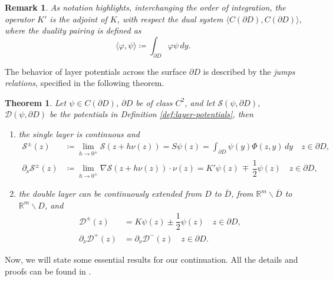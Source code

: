 \documentclass[10pt, a4paper, twoside, openright]{book}
\theoremstyle{definition}
\theoremstyle{plain}
\newtheorem{theorem}[subsection]{Theorem}
\theoremstyle{plain}
\theoremstyle{plain}
\theoremstyle{plain}
\newtheorem{remark}[subsection]{Remark}
\theoremstyle{plain}
\theoremstyle{plain}
\theoremstyle{plain}
\theoremstyle{plain}
\let\phi\varphi
\begin{document}
\begin{remark}
 As notation highlights, interchanging the order of integration, the operator $K'$ is the adjoint of $K$, with respect the dual system $\langle C(\partial D), C(\partial D)\rangle$, 
 where the duality pairing is defined as
 \begin{equation}
  \langle\phi,\psi\rangle\coloneqq\int_{\partial D}\phi\psi\,dy.
 \end{equation}
\end{remark}
The behavior of layer potentials across the surface $\partial D$ is described by the \emph{jumps relations}, 
specified in the following theorem.
\begin{theorem}
 Let $\psi\in C(\partial D)$, $\partial D$ be of class $C^2$, and let 
 $\mathcal{S}(\psi,\partial D)$, $\mathcal{D}(\psi,\partial D)$ be the potentials in 
 Definition \ref{def:layer-potentials}, then
 \begin{enumerate}
  \item the single layer is continuous and 
  \begin{subequations}
  \begin{align}
   \mathcal{S}^\pm(z) &\coloneqq\lim_{h\to 0^\pm}\mathcal{S}(z+h\nu(z)) = S\psi(z)=\int_{\partial D}\psi(y)\Phi(z,y)\,dy \quad z\in\partial D, \label{eq:single-pm-0}\\
   \partial_\nu\mathcal{S}^\pm(z) &\coloneqq \lim_{h\to0^\pm} \nabla\mathcal{S}(z+h\nu(z))\cdot\nu(z) =  K'\psi(z) \,\mp\,\dfrac{1}{2}\psi(z) \quad z\in\partial D,\label{eq:single-pm-1}
  \end{align}
 \end{subequations}
 \item the double layer can be continuously extended from $D$ to $\overline{D}$, from $\mathbb{R}^m\backslash \overline{D}$ to $\mathbb{R}^m\backslash D$, and
  \begin{subequations}
  \begin{align}
   \mathcal{D}^\pm(z) &= K\psi(z) \pm\dfrac{1}{2}\psi(z)\quad z\in\partial D, \label{eq:double-pm-0}\\
   \partial_\nu\mathcal{D}^+(z) &= \partial_\nu\mathcal{D}^-(z) \quad z\in\partial D. \label{eq:double-pm-1}
  \end{align}
  \end{subequations}
 \end{enumerate}
\end{theorem}
Now, we will state some essential results for our continuation.
All the details and proofs can be found in \cite{kress:book}.
\end{document}
